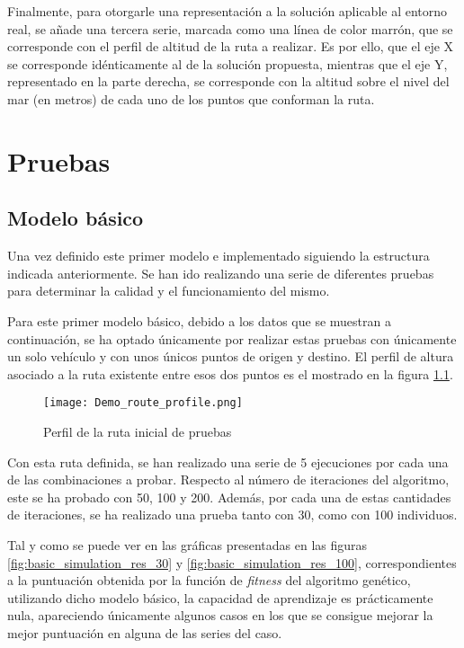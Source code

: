 \documentclass[11pt,spanish,listoffigures,listoftables]{tfgetsinf}
\begin{document}
Finalmente, para otorgarle una representación a la solución aplicable al entorno real, se añade una tercera serie, marcada como una línea de color marrón, que se corresponde con el perfil de altitud de la ruta a realizar. Es por ello, que el eje X se corresponde idénticamente al de la solución propuesta, mientras que el eje Y, representado en la parte derecha, se corresponde con la altitud sobre el nivel del mar (en metros) de cada uno de los puntos que conforman la ruta.

\chapter{Pruebas}
\section{Modelo básico}
Una vez definido este primer modelo e implementado siguiendo la estructura indicada anteriormente. Se han ido realizando una serie de diferentes pruebas para determinar la calidad y el funcionamiento del mismo.

Para este primer modelo básico, debido a los datos que se muestran a continuación, se ha optado únicamente por realizar estas pruebas con únicamente un solo vehículo y con unos únicos puntos de origen y destino. El perfil de altura asociado a la ruta existente entre esos dos puntos es el mostrado en la figura \ref{fig:test_profile}.

\begin{figure}[ht]
    \centering
    \texttt{[image: Demo\_route\_profile.png]}
    \caption{Perfil de la ruta inicial de pruebas}
    \label{fig:test_profile}
\end{figure}

Con esta ruta definida, se han realizado una serie de 5 ejecuciones por cada una de las combinaciones a probar. Respecto al número de iteraciones del algoritmo, este se ha probado con 50, 100 y 200. Además, por cada una de estas cantidades de iteraciones, se ha realizado una prueba tanto con 30, como con 100 individuos.

Tal y como se puede ver en las gráficas presentadas en las figuras \ref{fig:basic_simulation_res_30} y \ref{fig:basic_simulation_res_100}, correspondientes a la puntuación obtenida por la función de \textit{fitness} del algoritmo genético, utilizando dicho modelo básico, la capacidad de aprendizaje es prácticamente nula, apareciendo únicamente algunos casos en los que se consigue mejorar la mejor puntuación en alguna de las series del caso.
\end{document}
